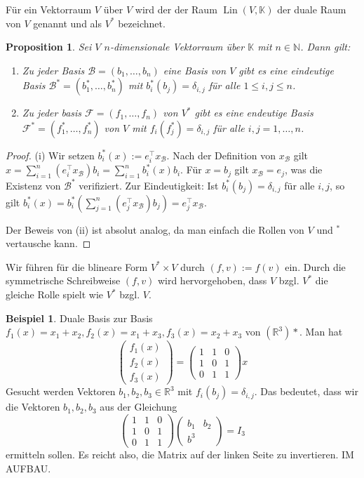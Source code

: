 \documentclass[
a4paper,landscape,16pt,
bibliography=totocnumbered,
numbers=noenddot,
]{scrartcl}
\numberwithin{equation}{subsection}
\newcommand{\N}{\mathbb N}
\newcommand{\R}{\mathbb R}
\newcommand{\K}{\mathbb K}
\newcommand{\Lin}{\operatorname{Lin}} %
\newcommand{\cB}{\mathcal{B}}
\newcommand{\cF}{\mathcal{F}}
\theoremstyle{plain}
\newtheorem*{propn}{Proposition}
\theoremstyle{definition}
\newtheorem*{bsp}{Beispiel}
\begin{document}
Für ein Vektorraum $V$ über $V$ wird der der Raum $\Lin(V,\K)$ der duale Raum von $V$ genannt und als $V^\ast$ bezeichnet. 

\begin{propn}
	Sei $V$ $n$-dimensionale Vektorraum über $\K$ mit $n \in \N$. Dann gilt: 
	\begin{enumerate} 
		\item Zu jeder Basis $\cB=(b_1,\ldots,b_n)$ eine Basis von $V$ gibt es eine eindeutige Basis $\cB^\ast= (b_1^\ast,\ldots, b_n^\ast)$ mit $b^\ast_i(b_j) = \delta_{i,j}$ für alle $1 \le i ,j \le n$. 
		\item Zu jeder basis $\cF= (f_1,\ldots,f_n)$  von $V^\ast$ gibt es eine endeutige Basis $\cF^\ast = (f_1^\ast,\ldots, f_n^\ast)$ von $V$ mit $f_i(f_j^\ast) = \delta_{i,j}$ für alle $i,j=1,\ldots,n$. 
	\end{enumerate} 
\end{propn}
\begin{proof} 
	(i) Wir setzen $b_i^\ast (x) := e_i^\top x_\cB$. Nach der Definition von $x_\cB$ gilt $x = \sum_{i=1}^n (e_i^\top x_\cB) b_i = \sum_{i=1}^n b_i^\ast(x) b_i$. Für $x = b_j$ gilt $x_\cB= e_j$, was die Existenz von $\cB^\ast$ verifiziert. Zur Eindeutigkeit: Ist $b_i^\ast(b_j) = \delta_{i,j}$ für alle $i,j$, so gilt $b_i^\ast(x) = b_i^\ast( \sum_{j=1}^n (e_j^\top x_\cB) b_j ) = e_j^\top x_\cB$. 
	
	Der Beweis von (ii) ist absolut analog, da man einfach die Rollen von $V$ und $^\ast$ vertausche kann. 
\end{proof} 

Wir führen für die blineare Form $V^\ast \times V$ durch $(f,v) := f(v)$ ein. Durch die symmetrische Schreibweise $(f,v)$ wird hervorgehoben, dass $V$ bzgl. $V^\ast$ die gleiche Rolle spielt wie $V^\ast$ bzgl. $V$. 

\begin{bsp}
	Duale Basis zur Basis $f_1(x) = x_1 + x_2, f_2(x) = x_1 + x_3, f_3(x) = x_2 + x_3$ von $(\R^3)\ast$. Man hat 
	\[
			\begin{pmatrix}
					f_1(x) \\ f_2(x) \\ f_3(x)  
			\end{pmatrix} 
			= 
			\begin{pmatrix}
					1 & 1& 0
					\\ 1 & 0 & 1 
					\\ 0 & 1 & 1 
			\end{pmatrix}
			x
	\]
	Gesucht werden Vektoren $b_1,b_2, b_3\in \R^3$ mit $f_i(b_j) = \delta_{i,j}$. Das bedeutet, dass wir die Vektoren $b_1,b_2,b_3$ aus der Gleichung 
	\[
			\begin{pmatrix}
	1 & 1& 0
	\\ 1 & 0 & 1 
	\\ 0 & 1 & 1 
\end{pmatrix}		
	\begin{pmatrix} b_1 & b_2 \\ b^3
	\end{pmatrix} 
	= I_3
	\]
	ermitteln sollen. Es reicht also, die Matrix auf der linken Seite zu invertieren. IM AUFBAU. 
\end{bsp} 
\end{document}
